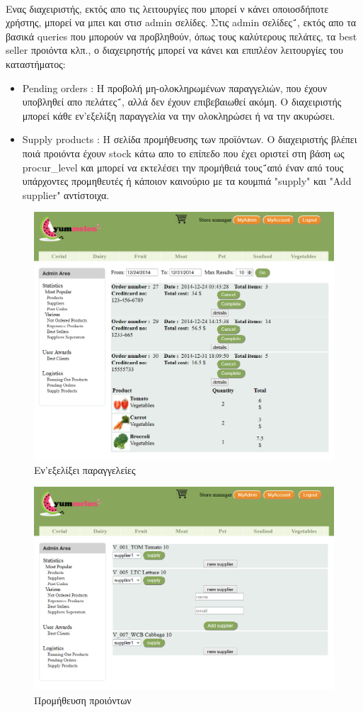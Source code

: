 \documentclass[12pt]{article}
\begin{document}
	  	 \paragraph{}
	  	 	Ενας διαχειριστής, εκτός απο τις λειτουργίες που μπορεί ν κάνει οποιοσδήποτε χρήστης, μπορεί να μπει και στισ admin σελίδες. Στις admin σελίδες΅, εκτός απο τα βασικά queries που μπορούν να προβληθούν, όπως τους καλύτερους πελάτες, τα best seller προιόντα κλπ., ο διαχειρηστής μπορεί να κάνει και επιπλέον λειτουργίες του καταστήματος:
	  	 	\begin{itemize}
	  	 	  \item Pending orders : Η προβολή μη-ολοκληρωμένων παραγγελιών, που έχουν υποβληθεί απο πελάτες΅, αλλά δεν έχουν επιβεβαιωθεί ακόμη. Ο διαχειριστής μπορεί κάθε εν'εξελίξη παραγγελία να την ολοκληρώσει ή να την ακυρώσει.
	  	 	  \item Supply products : Η σελίδα προμήθευσης των προϊόντων. Ο διαχειριστής βλέπει ποιά προιόντα έχουν stock κάτω απο το επίπεδο που έχει οριστεί στη βάση ως procur\_level και μπορεί να εκτελέσει την προμήθειά τους΅από έναν από τους υπάρχοντες προμηθευτές ή κάποιον καινούριο με τα κουμπιά "supply" και "Add supplier" αντίστοιχα.
	  	 	\end{itemize}
			\begin{figure}[H]
				\centering
				\includegraphics[width=1\textwidth]{pendingOrders}
				\caption{Εν'εξελίξει παραγγελείες}
			\end{figure}
			\begin{figure}[H]
				\centering
				\includegraphics[width=1\textwidth]{supplyProducts}
				\caption{Προμήθευση προιόντων}
			\end{figure}	  
\end{document}
